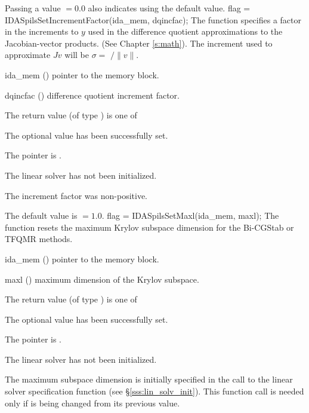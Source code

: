 {{  Passing a value $ = 0.0$ also indicates using the default value.
}
{
  flag = IDASpilsSetIncrementFactor(ida\_mem, dqincfac);
}
{
  The function  specifies a factor in the 
  increments to $y$ used in the difference quotient approximations 
  to the Jacobian-vector products.  (See Chapter \ref{s:math}).  The increment
  used to approximate $Jv$ will be $\sigma = $ $/\|v\|$.
}
{
  \begin{args}[dqincfac]
  \item[ida\_mem] ()
    pointer to the {\ida} memory block.
  \item[dqincfac] ()
    difference quotient increment factor.
  \end{args}
}
{
  The return value  (of type ) is one of
  \begin{args}
  \item[\Id{IDASPILS\_SUCCESS}] 
    The optional value has been successfully set.
  \item[\Id{IDASPILS\_MEM\_NULL}]
    The  pointer is .
  \item[\Id{IDASPILS\_LMEM\_NULL}]
    The {\idaspils} linear solver has not been initialized.
  \item[\Id{IDASPILS\_ILL\_INPUT}]
    The increment factor was non-positive.
  \end{args}
}
{
  The default value is  $=1.0$.
}
{
  flag = IDASpilsSetMaxl(ida\_mem, maxl);
}
{
  The function  resets the maximum Krylov subspace
  dimension for the Bi-CGStab or TFQMR 
  methods.
}
{
  \begin{args}
  \item[ida\_mem] ()
    pointer to the {\ida} memory block.
  \item[maxl] ()
    maximum dimension of the Krylov subspace.
  \end{args}
}
{
  The return value  (of type ) is one of
  \begin{args}
  \item[\Id{IDASPILS\_SUCCESS}] 
    The optional value has been successfully set.
  \item[\Id{IDASPILS\_MEM\_NULL}]
    The  pointer is .
  \item[\Id{IDASPILS\_LMEM\_NULL}]
    The {\idaspils} linear solver has not been initialized.
  \end{args}
}
{
  The maximum subspace dimension is initially specified in the call
  to the linear solver specification function (see \S\ref{sss:lin_solv_init}). 
  This function call is needed only if  is being changed from its 
  previous value.

}}
